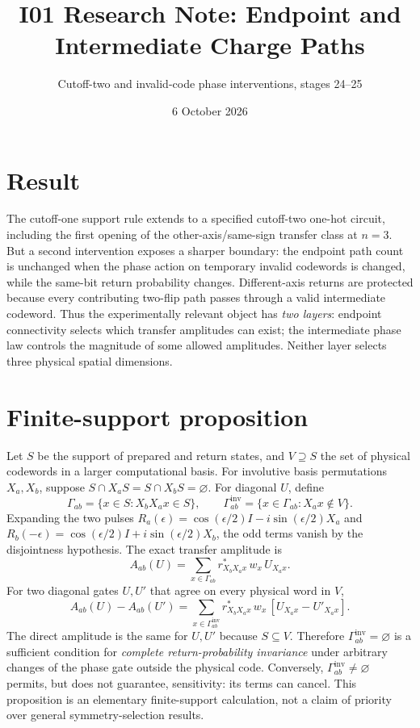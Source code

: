 \documentclass[10pt,a4paper]{article}
\title{I01 Research Note: Endpoint and Intermediate Charge Paths}
\author{Cutoff-two and invalid-code phase interventions, stages 24--25}
\date{6 October 2026}
\begin{document}
\maketitle
\vspace{-2em}

\section*{Result}
The cutoff-one support rule extends to a specified cutoff-two one-hot circuit, including the first opening of the other-axis/same-sign transfer class at $n=3$. But a second intervention exposes a sharper boundary: the endpoint path count is unchanged when the phase action on temporary invalid codewords is changed, while the same-bit return probability changes. Different-axis returns are protected because every contributing two-flip path passes through a valid intermediate codeword. Thus the experimentally relevant object has \emph{two layers}: endpoint connectivity selects which transfer amplitudes can exist; the intermediate phase law controls the magnitude of some allowed amplitudes. Neither layer selects three physical spatial dimensions.

\section*{Finite-support proposition}
Let $S$ be the support of prepared and return states, and $V\supseteq S$ the set of physical codewords in a larger computational basis. For involutive basis permutations $X_a,X_b$, suppose $S\cap X_aS=S\cap X_bS=\varnothing$. For diagonal $U$, define
\[
\Gamma_{ab}=\{x\in S:X_bX_ax\in S\},\qquad
\Gamma_{ab}^{\mathrm{inv}}=\{x\in\Gamma_{ab}:X_ax\notin V\}.
\]
Expanding the two pulses $R_a(\epsilon)=\cos(\epsilon/2)I-i\sin(\epsilon/2)X_a$ and $R_b(-\epsilon)=\cos(\epsilon/2)I+i\sin(\epsilon/2)X_b$, the odd terms vanish by the disjointness hypothesis. The exact transfer amplitude is
\begin{equation}\label{eq:path}
A_{ab}(U)=\sum_{x\in\Gamma_{ab}} r^*_{X_bX_ax}\,w_x\,U_{X_ax}.
\end{equation}
For two diagonal gates $U,U'$ that agree on every physical word in $V$,
\begin{equation}\label{eq:intermediate}
A_{ab}(U)-A_{ab}(U')=
\sum_{x\in\Gamma_{ab}^{\mathrm{inv}}}
 r^*_{X_bX_ax}\,w_x\,[U_{X_ax}-U'_{X_ax}].
\end{equation}
The direct amplitude is the same for $U,U'$ because $S\subseteq V$. Therefore $\Gamma_{ab}^{\mathrm{inv}}=\varnothing$ is a sufficient condition for \emph{complete return-probability invariance} under arbitrary changes of the phase gate outside the physical code. Conversely, $\Gamma_{ab}^{\mathrm{inv}}\neq\varnothing$ permits, but does not guarantee, sensitivity: its terms can cancel. This proposition is an elementary finite-support calculation, not a claim of priority over general symmetry-selection results.
\end{document}
